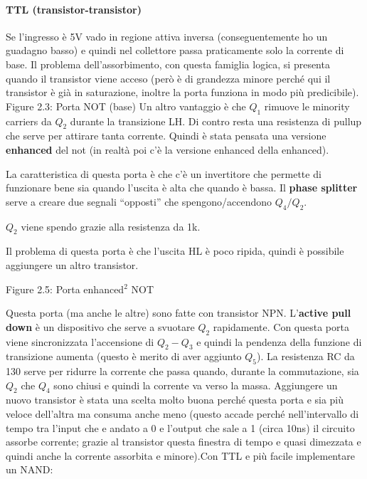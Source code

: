 \documentclass[
]{article}
\begin{document}
\paragraph{TTL (transistor-transistor)}\label{ttl-transistor-transistor}

Se l'ingresso è 5V vado in regione attiva inversa (conseguentemente ho
un guadagno basso) e quindi nel collettore passa praticamente solo la
corrente di base. Il problema dell'assorbimento, con questa famiglia
logica, si presenta quando il transistor viene acceso (però è di
grandezza minore perché qui il transistor è già in saturazione, inoltre
la porta funziona in modo più predicibile). Figure 2.3: Porta NOT (base)
Un altro vantaggio è che \(Q_{1}\) rimuove le minority carriers da
\(Q_{2}\) durante la transizione LH. Di contro resta una resistenza di
pullup che serve per attirare tanta corrente. \newline Quindi è stata
pensata una versione \textbf{enhanced} del not (in realtà poi c'è la
versione enhanced della enhanced).

La caratteristica di questa porta è che c'è un invertitore che permette
di funzionare bene sia quando l'uscita è alta che quando è bassa. Il
\textbf{phase splitter} serve a creare due segnali ``opposti'' che
spengono/accendono \(Q_{4}/Q_{2}\).

\(Q_{2}\) viene spendo grazie alla resistenza da 1k.

Il problema di questa porta è che l'uscita HL è poco ripida, quindi è
possibile aggiungere un altro transistor.

Figure 2.5: Porta enhanced\({}^{2}\) NOT

Questa porta (ma anche le altre) sono fatte con transistor NPN.
L'\textbf{active pull down} è un dispositivo che serve a svuotare
\(Q_{2}\) rapidamente. Con questa porta viene sincronizzata l'accensione
di \(Q_{2}-Q_{3}\) e quindi la pendenza della funzione di transizione
aumenta (questo è merito di aver aggiunto \(Q_{5}\)). La resistenza RC
da 130 serve per ridurre la corrente che passa quando, durante la
commutazione, sia \(Q_{2}\) che \(Q_{4}\) sono chiusi e quindi la
corrente va verso la massa. Aggiungere un nuovo transistor è stata una
scelta molto buona perché questa porta e sia più veloce dell'altra ma
consuma anche meno (questo accade perché nell'intervallo di tempo tra
l'input che e andato a 0 e l'output che sale a 1 (circa 10ns) il
circuito assorbe corrente; grazie al transistor questa finestra di tempo
e quasi dimezzata e quindi anche la corrente assorbita e
minore).\newline Con TTL e più facile implementare un NAND:
\end{document}
